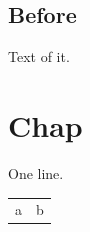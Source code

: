 \documentclass[a4paper]{book}
\begin{document}
\section*{Before}
Text of it.
\chapter*{Chap}
One line.
\begin{longtable}{ll}
\rule{0pt}{.8\textheight}a & b\\
\end{longtable}
\end{document}
